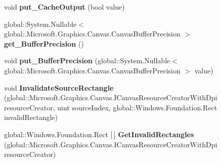 \begin{DoxyCompactItemize}
\item 
\mbox{\label{class_microsoft_1_1_graphics_1_1_canvas_1_1_effects_1_1_gamma_transfer_effect_a8080d749c610953532c3bd52fd94793c}} 
void {\bfseries put\+\_\+\+Cache\+Output} (bool value)
\item 
\mbox{\label{class_microsoft_1_1_graphics_1_1_canvas_1_1_effects_1_1_gamma_transfer_effect_af55afa5f79a97b1cceec29cbeb2330e5}} 
global\+::\+System.\+Nullable$<$ global\+::\+Microsoft.\+Graphics.\+Canvas.\+Canvas\+Buffer\+Precision $>$ {\bfseries get\+\_\+\+Buffer\+Precision} ()
\item 
\mbox{\label{class_microsoft_1_1_graphics_1_1_canvas_1_1_effects_1_1_gamma_transfer_effect_a300deb0c053300ec39f5106b236be035}} 
void {\bfseries put\+\_\+\+Buffer\+Precision} (global\+::\+System.\+Nullable$<$ global\+::\+Microsoft.\+Graphics.\+Canvas.\+Canvas\+Buffer\+Precision $>$ value)
\item 
\mbox{\label{class_microsoft_1_1_graphics_1_1_canvas_1_1_effects_1_1_gamma_transfer_effect_aa25dcd648dd5de4f94b73375b7ec14d6}} 
void {\bfseries Invalidate\+Source\+Rectangle} (global\+::\+Microsoft.\+Graphics.\+Canvas.\+I\+Canvas\+Resource\+Creator\+With\+Dpi resource\+Creator, uint source\+Index, global\+::\+Windows.\+Foundation.\+Rect invalid\+Rectangle)
\item 
\mbox{\label{class_microsoft_1_1_graphics_1_1_canvas_1_1_effects_1_1_gamma_transfer_effect_a8462325d6811ab97f15498ebcb98f049}} 
global\+::\+Windows.\+Foundation.\+Rect \mbox{[}$\,$\mbox{]} {\bfseries Get\+Invalid\+Rectangles} (global\+::\+Microsoft.\+Graphics.\+Canvas.\+I\+Canvas\+Resource\+Creator\+With\+Dpi resource\+Creator)
\item 
\mbox{\label{class_microsoft_1_1_graphics_1_1_canvas_1_1_effects_1_1_gamma_transfer_effect_a2b4015e274ef2a2e8fffdc2ca238b5ae}} 

\end{DoxyCompactItemize}
